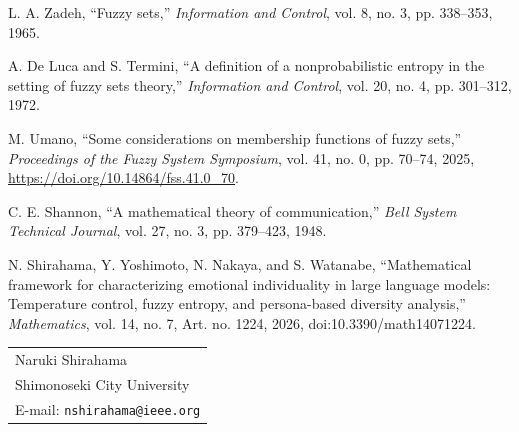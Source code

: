\documentclass[a4paper,10pt,twocolumn]{myjarticle2}
\begin{document}
\vspace{1mm}
\par\noindent
[1] L. A. Zadeh, ``Fuzzy sets,'' \emph{Information and Control}, vol. 8,
no. 3, pp. 338--353, 1965.
\par\noindent
[2] A. De Luca and S. Termini, ``A definition of a nonprobabilistic entropy in
the setting of fuzzy sets theory,'' \emph{Information and Control}, vol. 20,
no. 4, pp. 301--312, 1972.
\par\noindent
[3] M. Umano, ``Some considerations on membership functions of fuzzy sets,''
\emph{Proceedings of the Fuzzy System Symposium}, vol. 41, no. 0, pp. 70--74,
2025, \url{https://doi.org/10.14864/fss.41.0_70}.
\par\noindent
[4] C. E. Shannon, ``A mathematical theory of communication,'' \emph{Bell
System Technical Journal}, vol. 27, no. 3, pp. 379--423, 1948.
\par\noindent
[5] N. Shirahama, Y. Yoshimoto, N. Nakaya, and S. Watanabe, ``Mathematical
framework for characterizing emotional individuality in large language models:
Temperature control, fuzzy entropy, and persona-based diversity analysis,''
\emph{Mathematics}, vol. 14, no. 7, Art. no. 1224, 2026,
doi:10.3390/math14071224.

\vspace{1mm}
\par\noindent
\begin{tabular}{l}
Naruki Shirahama \\
Shimonoseki City University\\
E-mail: {\tt  nshirahama@ieee.org}
\end{tabular}
\end{document}
